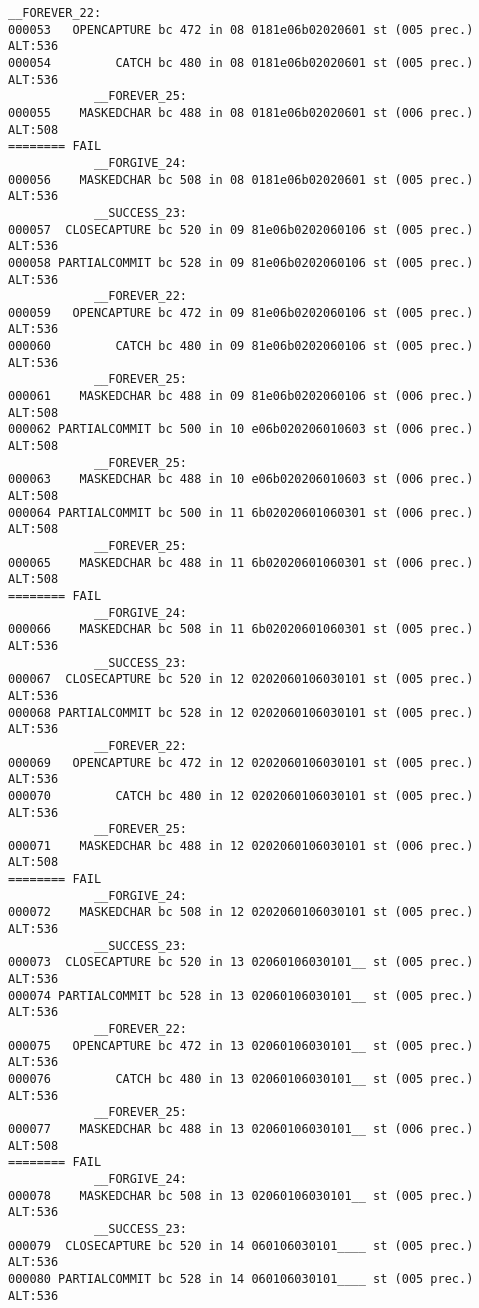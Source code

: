 \begin{changemargin}{-60mm}{0mm}
\begin{myquote}
\begin{Verbatim}[fontsize=\scriptsize]
            __FOREVER_22:
000053   OPENCAPTURE bc 472 in 08 0181e06b02020601 st (005 prec.) ALT:536 
000054         CATCH bc 480 in 08 0181e06b02020601 st (005 prec.) ALT:536 
            __FOREVER_25:
000055    MASKEDCHAR bc 488 in 08 0181e06b02020601 st (006 prec.) ALT:508 
======== FAIL
            __FORGIVE_24:
000056    MASKEDCHAR bc 508 in 08 0181e06b02020601 st (005 prec.) ALT:536 
            __SUCCESS_23:
000057  CLOSECAPTURE bc 520 in 09 81e06b0202060106 st (005 prec.) ALT:536 
000058 PARTIALCOMMIT bc 528 in 09 81e06b0202060106 st (005 prec.) ALT:536 
            __FOREVER_22:
000059   OPENCAPTURE bc 472 in 09 81e06b0202060106 st (005 prec.) ALT:536 
000060         CATCH bc 480 in 09 81e06b0202060106 st (005 prec.) ALT:536 
            __FOREVER_25:
000061    MASKEDCHAR bc 488 in 09 81e06b0202060106 st (006 prec.) ALT:508 
000062 PARTIALCOMMIT bc 500 in 10 e06b020206010603 st (006 prec.) ALT:508 
            __FOREVER_25:
000063    MASKEDCHAR bc 488 in 10 e06b020206010603 st (006 prec.) ALT:508 
000064 PARTIALCOMMIT bc 500 in 11 6b02020601060301 st (006 prec.) ALT:508 
            __FOREVER_25:
000065    MASKEDCHAR bc 488 in 11 6b02020601060301 st (006 prec.) ALT:508 
======== FAIL
            __FORGIVE_24:
000066    MASKEDCHAR bc 508 in 11 6b02020601060301 st (005 prec.) ALT:536 
            __SUCCESS_23:
000067  CLOSECAPTURE bc 520 in 12 0202060106030101 st (005 prec.) ALT:536 
000068 PARTIALCOMMIT bc 528 in 12 0202060106030101 st (005 prec.) ALT:536 
            __FOREVER_22:
000069   OPENCAPTURE bc 472 in 12 0202060106030101 st (005 prec.) ALT:536 
000070         CATCH bc 480 in 12 0202060106030101 st (005 prec.) ALT:536 
            __FOREVER_25:
000071    MASKEDCHAR bc 488 in 12 0202060106030101 st (006 prec.) ALT:508 
======== FAIL
            __FORGIVE_24:
000072    MASKEDCHAR bc 508 in 12 0202060106030101 st (005 prec.) ALT:536 
            __SUCCESS_23:
000073  CLOSECAPTURE bc 520 in 13 02060106030101__ st (005 prec.) ALT:536 
000074 PARTIALCOMMIT bc 528 in 13 02060106030101__ st (005 prec.) ALT:536 
            __FOREVER_22:
000075   OPENCAPTURE bc 472 in 13 02060106030101__ st (005 prec.) ALT:536 
000076         CATCH bc 480 in 13 02060106030101__ st (005 prec.) ALT:536 
            __FOREVER_25:
000077    MASKEDCHAR bc 488 in 13 02060106030101__ st (006 prec.) ALT:508 
======== FAIL
            __FORGIVE_24:
000078    MASKEDCHAR bc 508 in 13 02060106030101__ st (005 prec.) ALT:536 
            __SUCCESS_23:
000079  CLOSECAPTURE bc 520 in 14 060106030101____ st (005 prec.) ALT:536 
000080 PARTIALCOMMIT bc 528 in 14 060106030101____ st (005 prec.) ALT:536 

\end{Verbatim}
\end{myquote}
\end{changemargin}

